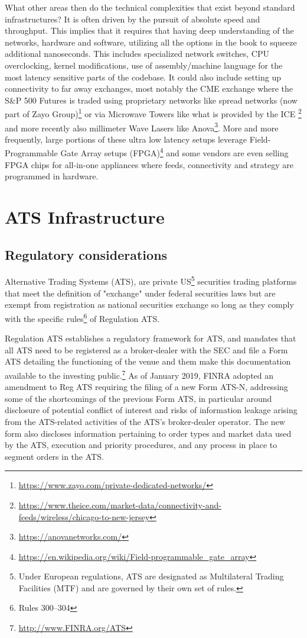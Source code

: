 What other areas then do the technical complexities that exist beyond standard infrastructures? It is often driven by the pursuit of absolute speed and throughput. This implies that it requires that having deep understanding of the networks, hardware and software, utilizing all the options in the book to squeeze additional nanoseconds. This includes specialized network switches, CPU overclocking, kernel modifications, use of assembly/machine language for the most latency sensitive parts of the codebase. It could also include setting up connectivity to far away exchanges, most notably the CME exchange where the S\&P 500 Futures is traded using proprietary networks like spread networks (now part of Zayo Group)\footnote{\url{https://www.zayo.com/private-dedicated-networks/}} or via Microwave Towers like what is provided by the ICE \footnote{\url{https://www.theice.com/market-data/connectivity-and-feeds/wireless/chicago-to-new-jersey}} and more recently also millimeter Wave Lasers like Anova\footnote{\url{https://anovanetworks.com/}}. More and more frequently, large portions of these ultra low latency setups leverage Field-Programmable Gate Array setups (FPGA)\footnote{\url{https://en.wikipedia.org/wiki/Field-programmable_gate_array}} and some vendors are even selling FPGA chips for all-in-one appliances where  feeds, connectivity and strategy are programmed in hardware.



\section{ATS Infrastructure}
\subsection{Regulatory considerations}


Alternative Trading Systems (ATS), are private US\footnote{Under European regulations, ATS are designated as Multilateral Trading Facilities (MTF) and are governed by their own set of rules.} securities trading platforms that meet the definition of "exchange" under federal securities laws but are exempt from registration as national securities exchange so long as they comply with the specific rules\footnote{Rules 300--304} of Regulation ATS.


Regulation ATS establishes a regulatory framework for ATS, and mandates that all ATS need to be registered as a broker-dealer with the SEC and file a Form ATS detailing the functioning of the venue and them make this documentation available to the investing public.\footnote{\url{http://www.FINRA.org/ATS}} As of January 2019, FINRA adopted an amendment to Reg ATS requiring the filing of a new Form ATS-N, addressing some of the shortcomings of the previous Form ATS, in particular around disclosure of potential conflict of interest and risks of information leakage arising from the ATS-related activities of the ATS's broker-dealer operator. The new form also discloses information pertaining to order types and market data used by the ATS, execution and priority procedures, and any process in place to segment orders in the ATS.


